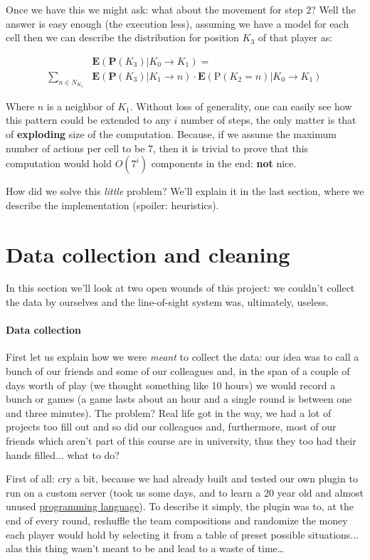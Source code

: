 \documentclass[9pt, a4paper]{IEEEtran}
\begin{document}
    Once we have this we might ask: what about the movement for step $2$? Well the answer is easy enough (the execution less), assuming we have a model for each cell then we can describe the distribution for position $K_3$ of that player as:

    \begin{align*}
        &\mathbf{E}\left( \mathbf{P}\left(K_3\right) | K_0 \to K_1\right) =\\
        \sum_{n \in N_{K_1}} &\mathbf{E}\left( \mathbf{P}\left(K_3\right)  | K_1 \to n\right)\cdot\mathbf{E}\left(\mathrm{P}(K_2 = n) | K_0 \to K_1\right)
    \end{align*}

    Where $n$ is a neighbor of $K_1$. Without loss of generality, one can easily see how this pattern could be extended to any $i$ number of steps, the only matter is that of \textbf{exploding} size of the computation. Because, if we assume the maximum number of actions per cell to be $7$, then it is trivial to prove that this computation would hold $O(7^i)$ components in the end: \textbf{not} nice.

    How did we solve this \emph{little} problem? We'll explain it in the last section, where we describe the implementation (spoiler: heuristics).

    \section{Data collection and cleaning}
    In this section we'll look at two open wounds of this project: we couldn't collect the data by ourselves and the line-of-sight system was, ultimately, useless.

    \paragraph*{Data collection} First let us explain how we were \emph{meant} to collect the data: our idea was to call a bunch of our friends and some of our colleagues and, in the span of a couple of days worth of play (we thought something like 10 hours) we would record a bunch or games (a game lasts about an hour and a single round is between one and three minutes).
    The problem? Real life got in the way, we had a lot of projects too fill out and so did our colleagues and, furthermore, most of our friends which aren't part of this course are in university, thus they too had their hands filled... what to do?

    First of all: cry a bit, because we had already built and tested our own plugin to run on a custom server (took us some days, and to learn a 20 year old and almost unused \href{https://developer.valvesoftware.com/wiki/Squirrel}{programming language}). To describe it simply, the plugin was to, at the end of every round, reshuffle the team compositions and randomize the money each player would hold by selecting it from a table of preset possible situations... alas this thing wasn't meant to be and lead to a waste of time\dots 
    
\end{document}
